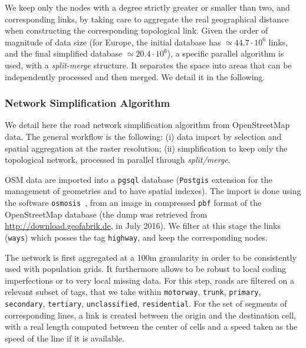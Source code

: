 

We keep only the nodes with a degree strictly greater or smaller than two, and corresponding links, by taking care to aggregate the real geographical distance when constructing the corresponding topological link. Given the order of magnitude of data size (for Europe, the initial database has $\simeq 44.7\cdot 10^6$ links, and the final simplified database $\simeq 20.4\cdot 10^6$), a specific parallel algorithm is used, with a \emph{split-merge} structure. It separates the space into areas that can be independently processed and then merged. We detail it in the following.


\subsubsection{Network Simplification Algorithm}


We detail here the road network simplification algorithm from OpenStreetMap data. The general workflow is the following: (i) data import by selection and spatial aggregation at the raster resolution; (ii) simplification to keep only the topological network, processed in parallel through \emph{split/merge}.

OSM data are imported into a \texttt{pgsql} database (\texttt{Postgis} extension for the management of geometries and to have spatial indexes). The import is done using the software \texttt{osmosis}~\cite{osmosis}, from an image in compressed \texttt{pbf} format of the OpenStreetMap database (the dump was retrieved from \url{http://download.geofabrik.de}, in July 2016). We filter at this stage the links (\texttt{ways}) which posses the tag \texttt{highway}, and keep the corresponding nodes.


The network is first aggregated at a 100m granularity in order to be consistently used with population grids. It furthermore allows to be robust to local coding imperfections or to very local missing data. For this step, roads are filtered on a relevant subset of tags, that we take within \texttt{motorway}, \texttt{trunk}, \texttt{primary}, \texttt{secondary}, \texttt{tertiary}, \texttt{unclassified}, \texttt{residential}. For the set of segments of corresponding lines, a link is created between the origin and the destination cell, with a real length computed between the center of cells and a speed taken as the speed of the line if it is available.

